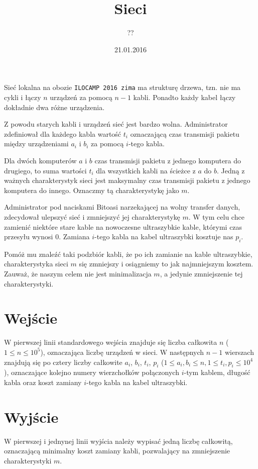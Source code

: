 \documentclass[zad,zawodnik,utf8]{sinol}
\title{Sieci}
\author{??} %
\date{21.01.2016}
\begin{document}
\begin{tasktext}%

Sieć lokalna na obozie \texttt{ILOCAMP 2016 zima} ma strukturę drzewa, tzn. nie ma cykli i łączy $n$ urządzeń za pomocą $n-1$ kabli. Ponadto każdy kabel łączy dokładnie dwa różne urządzenia.



Z powodu starych kabli i urządzeń sieć jest bardzo wolna. Administrator zdefiniował dla każdego kabla wartość $t_i$ oznaczającą czas transmisji pakietu między urządzeniami $a_i$ i $b_i$ za pomocą $i$-tego kabla.

Dla dwóch komputerów $a$ i $b$ czas transmisji pakietu z jednego komputera do drugiego, to suma wartości $t_i$ dla wszystkich kabli na ścieżce z $a$ do $b$. Jedną z ważnych charakterystyk sieci jest maksymalny czas transmisji pakietu z jednego komputera do innego. Oznaczmy tą charakterystykę jako $m$.



Administrator pod naciskami Bitoasi narzekającej na wolny transfer danych, zdecydował ulepszyć sieć i zmniejszyć jej charakterystykę $m$. W tym celu chce zamienić niektóre stare kable na nowoczesne ultraszybkie kable, którymi czas przesyłu wynosi $0$. Zamiana $i$-tego kabla na kabel ultraszybki kosztuje nas $p_i$.



Pomóż mu znaleźć taki podzbiór kabli, że po ich zamianie na kable ultraszybkie, charakterystyka sieci $m$ się zmniejszy i osiągniemy to jak najmniejszym kosztem. Zauważ, że naszym celem nie jest minimalizacja $m$, a jedynie zmniejszenie tej charakterystyki.





\section{Wejście}

W pierwszej linii standardowego wejścia znajduje się liczba całkowita $n$ ($1\leq n \leq 10^5$), oznaczająca liczbę urządzeń w sieci. W następnych $n-1$ wierszach znajdują się po cztery liczby całkowite $a_i$, $b_i$, $t_i$, $p_i$ ($1\leq a_i, b_i\leq n, 1\leq t_i, p_i \leq 10^4$), oznaczające kolejno numery wierzchołków połączonych $i$-tym kablem, długość kabla oraz koszt zamiany $i$-tego kabla na kabel ultraszybki.



\section{Wyjście}

	

W pierwszej i jednynej linii wyjścia należy wypisać jedną liczbę całkowitą, oznaczającą minimalny koszt zamiany kabli, pozwalający na zmniejszenie charakterystyki $m$.



\makecompactexample



\end{tasktext}
\end{document}

